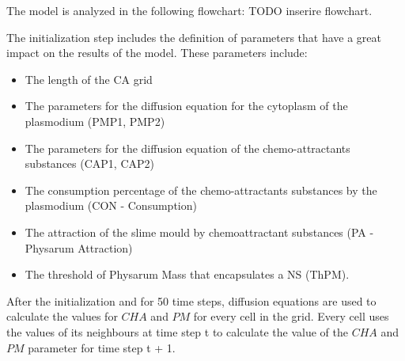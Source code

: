 \par
The model is analyzed in the following flowchart: TODO inserire flowchart.

\par
The initialization step includes the definition of parameters that have a great impact on the results of the model. These parameters include:
\begin{itemize}
	\item The length of the CA grid
	\item The parameters for the diffusion equation for the cytoplasm of the plasmodium (PMP1, PMP2)
	\item The parameters for the diffusion equation of the chemo-attractants substances (CAP1, CAP2)
	\item The consumption percentage of the chemo-attractants substances by the plasmodium (CON - Consumption)
	\item The attraction of the slime mould by chemoattractant substances (PA - Physarum Attraction)
	\item The threshold of Physarum Mass that encapsulates a NS (ThPM).
\end{itemize}

\par
After the initialization and for 50 time steps, diffusion equations are used to calculate the values for $CHA$ and $PM$ for every cell in the grid. Every cell uses the values of its neighbours at time step t to calculate the value of the $CHA$ and $PM$ parameter for time step t + 1. 

